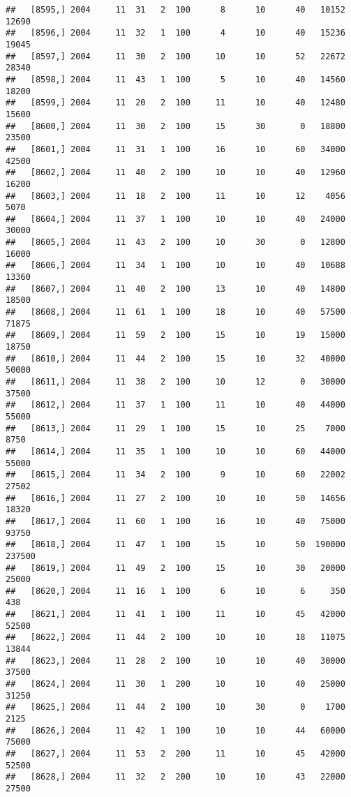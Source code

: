 \documentclass{article}\usepackage[]{graphicx}\usepackage[]{color}
\makeatletter
\newenvironment{kframe}{%
 \def\at@end@of@kframe{}%
 \ifinner\ifhmode%
  \def\at@end@of@kframe{\end{minipage}}%
  \begin{minipage}{\columnwidth}%
 \fi\fi%
 \def\FrameCommand##1{\hskip\@totalleftmargin \hskip-\fboxsep
 \colorbox{shadecolor}{##1}\hskip-\fboxsep
     \hskip-\linewidth \hskip-\@totalleftmargin \hskip\columnwidth}%
 \MakeFramed {\advance\hsize-\width
   \@totalleftmargin\z@ \linewidth\hsize
   \@setminipage}}%
 {\par\unskip\endMakeFramed%
 \at@end@of@kframe}
\newenvironment{knitrout}{}{} %
\makeatother
\begin{document}
\begin{knitrout}
\begin{kframe}
\begin{verbatim}
##   [8595,] 2004     11  31   2  100      8      10      40   10152   12690
##   [8596,] 2004     11  32   1  100      4      10      40   15236   19045
##   [8597,] 2004     11  30   2  100     10      10      52   22672   28340
##   [8598,] 2004     11  43   1  100      5      10      40   14560   18200
##   [8599,] 2004     11  20   2  100     11      10      40   12480   15600
##   [8600,] 2004     11  30   2  100     15      30       0   18800   23500
##   [8601,] 2004     11  31   1  100     16      10      60   34000   42500
##   [8602,] 2004     11  40   2  100     10      10      40   12960   16200
##   [8603,] 2004     11  18   2  100     11      10      12    4056    5070
##   [8604,] 2004     11  37   1  100     10      10      40   24000   30000
##   [8605,] 2004     11  43   2  100     10      30       0   12800   16000
##   [8606,] 2004     11  34   1  100     10      10      40   10688   13360
##   [8607,] 2004     11  40   2  100     13      10      40   14800   18500
##   [8608,] 2004     11  61   1  100     18      10      40   57500   71875
##   [8609,] 2004     11  59   2  100     15      10      19   15000   18750
##   [8610,] 2004     11  44   2  100     15      10      32   40000   50000
##   [8611,] 2004     11  38   2  100     10      12       0   30000   37500
##   [8612,] 2004     11  37   1  100     11      10      40   44000   55000
##   [8613,] 2004     11  29   1  100     15      10      25    7000    8750
##   [8614,] 2004     11  35   1  100     10      10      60   44000   55000
##   [8615,] 2004     11  34   2  100      9      10      60   22002   27502
##   [8616,] 2004     11  27   2  100     10      10      50   14656   18320
##   [8617,] 2004     11  60   1  100     16      10      40   75000   93750
##   [8618,] 2004     11  47   1  100     15      10      50  190000  237500
##   [8619,] 2004     11  49   2  100     15      10      30   20000   25000
##   [8620,] 2004     11  16   1  100      6      10       6     350     438
##   [8621,] 2004     11  41   1  100     11      10      45   42000   52500
##   [8622,] 2004     11  44   2  100     10      10      18   11075   13844
##   [8623,] 2004     11  28   2  100     10      10      40   30000   37500
##   [8624,] 2004     11  30   1  200     10      10      40   25000   31250
##   [8625,] 2004     11  44   2  100     10      30       0    1700    2125
##   [8626,] 2004     11  42   1  100     10      10      44   60000   75000
##   [8627,] 2004     11  53   2  200     11      10      45   42000   52500
##   [8628,] 2004     11  32   2  200     10      10      43   22000   27500

\end{verbatim}
\end{kframe}
\end{knitrout}
\end{document}
